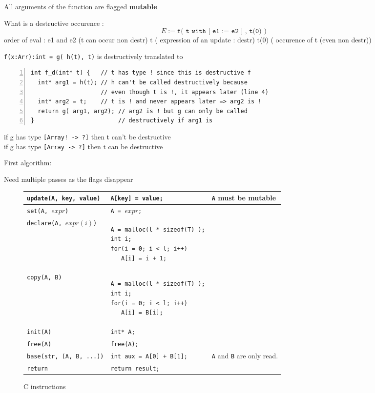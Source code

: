 \documentclass[12pt,a4paper,titlepage]{article}
\newcommand{\cl}[1]{\texttt{#1}}
\newcommand{\mut}{  \textbf{ mutable } }
\begin{document}
All arguments of the function are flagged \mut 




What is a destructive occurence :
$$ E :=  \cl{f(  t with [ e1 := e2 ] , t(0) )} $$
order of eval :
e1 and e2  (t can occur non destr)
t          ( expression of an update : destr)
t(0)       ( occurence of t (even non destr))

\cl{f(x:Arr):int = g( h(t), t)}  is destructively translated to \\
\begin{lstlisting}[numbers=left,caption=Example]
int f_d(int* t) {   // t has type ! since this is destructive f
  int* arg1 = h(t); // h can't be called destructively because
                    // even though t is !, it appears later (line 4)
  int* arg2 = t;    // t is ! and never appears later => arg2 is !
  return g( arg1, arg2); // arg2 is ! but g can only be called
}                        // destructively if arg1 is
\end{lstlisting}

if g has type \cl{[Array! -> ?]} then t can't be destructive\\

if g has type \cl{[Array -> ?]} then t can be destructive

First algorithm:


Need multiple passes as the flags disappear




\begin{figure}
\begin{tabular}{|p{50mm}|p{62mm}|p{45mm}|}
\hline
\cl{update(A, key, value)} & \cl{A[key] = value;} & \cl{A} must be \mut \\ \hline
\cl{set(A, $expr$)} & \cl{A = $expr$;} \\ \hline
\cl{declare(A, $expr(i)$)} & \begin{lstlisting}
A = malloc(l * sizeof(T) );
int i;
for(i = 0; i < l; i++)
   A[i] = i + 1;
\end{lstlisting} & \\ \hline
\cl{copy(A, B)} & \begin{lstlisting}
A = malloc(l * sizeof(T) );
int i;
for(i = 0; i < l; i++)
   A[i] = B[i];
\end{lstlisting} & \\ \hline
\cl{init(A)} & \cl{int* A;} & \\ \hline
\cl{free(A)} & \cl{free(A);} & \\ \hline
\cl{base(str, (A, B, ...))} & \cl{int aux = A[0] + B[1];} & \cl{A} and \cl{B} are only read. \\ \hline
\cl{return} & \cl{return result;} & \\ \hline
\end{tabular}
\caption{C instructions}
\end{figure}
\end{document}
